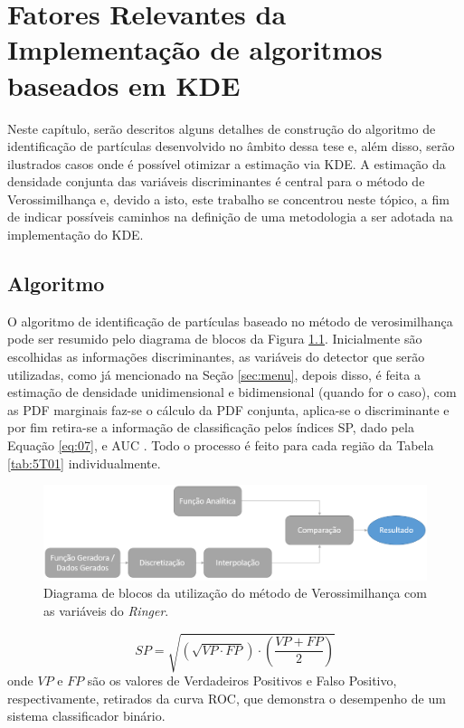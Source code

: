 \chapter{Fatores Relevantes da Implementação de algoritmos baseados em KDE}\label{cap:algoritmo}

Neste capítulo, serão descritos alguns detalhes de construção do algoritmo de identificação de partículas desenvolvido no âmbito dessa tese e, além disso, serão ilustrados casos onde é possível otimizar a estimação via KDE. A estimação da densidade conjunta das variáveis discriminantes é central para o método de Verossimilhança e, devido a isto, este trabalho se concentrou neste tópico, a fim de indicar possíveis caminhos na definição de uma metodologia a ser adotada na implementação do KDE.

\section{Algoritmo}

O algoritmo de identificação de partículas baseado no método de verosimilhança pode ser resumido pelo diagrama de blocos da Figura \ref{fig:08}. Inicialmente são escolhidas as informações discriminantes, as variáveis do detector que serão utilizadas, como já mencionado na Seção \ref{sec:menu}, depois disso, é feita a estimação de densidade unidimensional e bidimensional (quando for o caso), com as PDF marginais faz-se o cálculo da PDF conjunta, aplica-se o discriminante e por fim retira-se a informação de classificação pelos índices \ac{SP}, dado pela Equação \ref{eq:07}, e \ac{AUC} \cite{bradley1997use}. Todo o processo é feito para cada região da Tabela \ref{tab:5T01} individualmente.

\begin{figure}[!ht]
	\begin{center}
		\includegraphics[width=0.9\linewidth]{./figuras/algoritmo1.png}
		\caption{Diagrama de blocos da utilização do método de Verossimilhança com as variáveis do \textit{Ringer}.}\label{fig:08}
	\end{center}
\end{figure}

\begin{equation}\label{eq:07}
    SP = \sqrt {\left( {\sqrt {VP \cdot FP} } \right) \cdot \left( {\frac{{VP + FP}}{2}} \right)}
\end{equation}
onde $VP$ e $FP$ são os valores de Verdadeiros Positivos e Falso Positivo, respectivamente, retirados da curva \ac{ROC}, que demonstra o desempenho de um sistema classificador binário.

